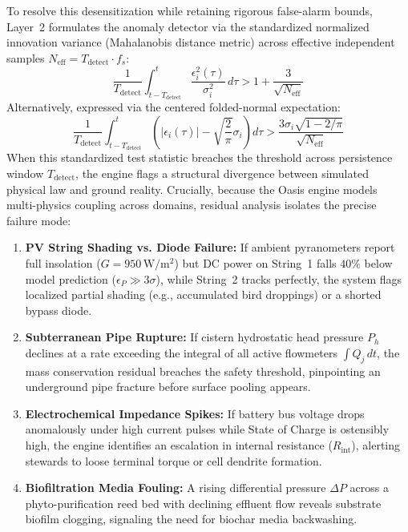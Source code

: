 To resolve this desensitization while retaining rigorous false-alarm bounds, Layer~2 formulates the anomaly detector via the standardized normalized innovation variance (Mahalanobis distance metric) across effective independent samples $N_{\mathrm{eff}} = T_{\mathrm{detect}} \cdot f_s$:
\begin{equation}
\frac{1}{T_{\mathrm{detect}}} \int_{t - T_{\mathrm{detect}}}^{t} \frac{\epsilon_i^2(\tau)}{\sigma_i^2} \, d\tau > 1 + \frac{3}{\sqrt{N_{\mathrm{eff}}}}
\label{eq:l2_anomaly_condition}
\end{equation}
Alternatively, expressed via the centered folded-normal expectation:
\begin{equation}
\frac{1}{T_{\mathrm{detect}}} \int_{t - T_{\mathrm{detect}}}^{t} \left( |\epsilon_i(\tau)| - \sqrt{\frac{2}{\pi}}\sigma_i \right) d\tau > \frac{3 \sigma_i \sqrt{1 - 2/\pi}}{\sqrt{N_{\mathrm{eff}}}}
\label{eq:l2_anomaly_folded_normal}
\end{equation}
When this standardized test statistic breaches the threshold across persistence window $T_{\mathrm{detect}}$, the engine flags a structural divergence between simulated physical law and ground reality. Crucially, because the Oasis engine models multi-physics coupling across domains, residual analysis isolates the precise failure mode:
\begin{enumerate}
    \item \textbf{PV String Shading vs. Diode Failure:} If ambient pyranometers report full insolation ($G = 950\,\mathrm{W/m^2}$) but DC power on String~1 falls $40\%$ below model prediction ($\epsilon_{P} \gg 3\sigma$), while String~2 tracks perfectly, the system flags localized partial shading (e.g., accumulated bird droppings) or a shorted bypass diode.
    \item \textbf{Subterranean Pipe Rupture:} If cistern hydrostatic head pressure $P_h$ declines at a rate exceeding the integral of all active flowmeters $\int Q_j \, dt$, the mass conservation residual breaches the safety threshold, pinpointing an underground pipe fracture before surface pooling appears.
    \item \textbf{Electrochemical Impedance Spikes:} If battery bus voltage drops anomalously under high current pulses while State of Charge is ostensibly high, the engine identifies an escalation in internal resistance ($R_{\mathrm{int}}$), alerting stewards to loose terminal torque or cell dendrite formation.
    \item \textbf{Biofiltration Media Fouling:} A rising differential pressure $\Delta P$ across a phyto-purification reed bed with declining effluent flow reveals substrate biofilm clogging, signaling the need for biochar media backwashing.
\end{enumerate}

